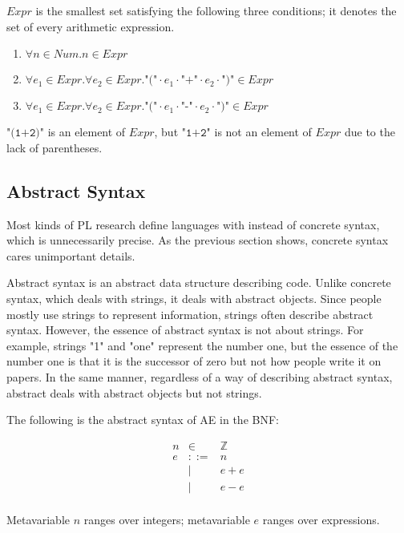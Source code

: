 \(Expr\) is the smallest set satisfying the following three conditions; it
denotes the set of every arithmetic expression.

\begin{enumerate}
\item \(\forall n\in Num.n\in Expr\)
\item \(\forall e_1\in Expr.\forall e_2\in Expr.{\texttt{"("}}\cdot e_1\cdot{\texttt{"+"}}\cdot
e_2\cdot{\texttt{")"}}\in Expr\)
\item \(\forall e_1\in Expr.\forall e_2\in Expr.{\texttt{"("}}\cdot
e_1\cdot\texttt{"-"}\cdot e_2\cdot{\texttt{")"}}\in Expr\)
\end{enumerate}

\(\texttt{"(1+2)"}\) is an element of \(Expr\), but \(\texttt{"1+2"}\) is not an element
of \(Expr\) due to the lack of parentheses.

\subsection{Abstract Syntax}

Most kinds of PL research define languages with  instead of
concrete syntax, which is unnecessarily precise. As the previous section shows,
concrete syntax cares unimportant details.

Abstract syntax is an abstract data structure describing code. Unlike concrete
syntax, which deals with strings, it deals with abstract objects. Since people
mostly use strings to represent information, strings often describe abstract
syntax. However, the essence of abstract syntax is not about strings. For
example, strings "1" and "one" represent the number one, but the essence of the
number one is that it is the successor of zero but not how people write it on
papers. In the same manner, regardless of a way of describing abstract syntax,
abstract deals with abstract objects but not strings.

The following is the abstract syntax of AE in the BNF:

\[
\begin{array}{rcl}
n & \in & \mathbb{Z} \\
e & ::= & n \\
& | & e+e \\
& | & e-e \\
\end{array}
\]

Metavariable \(n\) ranges over integers; metavariable \(e\) ranges over
expressions.

